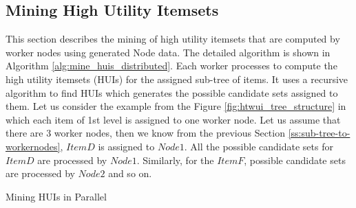 \documentclass[11pt,openright]{report}
\begin{document}
\subsection{Mining High Utility Itemsets} \label{ss:minehuis}
This section describes the mining of high utility itemsets that are computed by worker nodes using generated Node data. The detailed algorithm is shown in Algorithm \ref{alg:mine_huis_distributed}. Each worker processes to compute the high utility itemsets (HUIs) for the assigned sub-tree of items. It uses a recursive algorithm to find HUIs which generates the possible candidate sets assigned to them. Let us consider the example from the Figure \ref{fig:htwui_tree_structure} in which each item of 1st level is assigned to one worker node. Let us assume that there are 3 worker nodes, then we know from the previous Section \ref{ss:sub-tree-to-workernodes}, $ItemD$ is assigned to $Node 1$. All the possible candidate sets for $ItemD$ are processed by $Node1$. Similarly, for the $ItemF$, possible candidate sets are processed by $Node2$ and so on.

{\SetAlgoNoLine
	\begin{algorithm}
		\caption{Mining HUIs in Parallel}
		\label{alg:mine_huis_distributed}
	\end{algorithm}
}

\newpage
\end{document}
